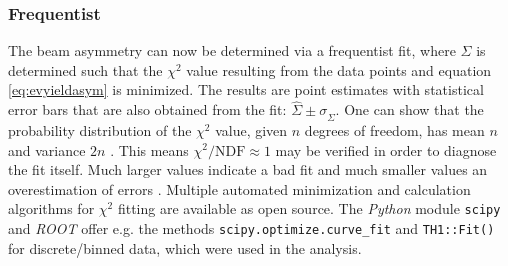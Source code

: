 \subsubsection{Frequentist}
The beam asymmetry can now be determined via a frequentist fit, where $\Sigma$ is determined such that the $\chi^2$ value resulting from the data points and equation \ref{eq:evyieldasym} is minimized. The results are point estimates with statistical error bars that are also obtained from the fit: $\hat{\Sigma}\pm\sigma_{\hat{\Sigma}}$. One can show that the probability distribution of the $\chi^2$ value, given $n$ degrees of freedom, has mean $n$ and variance $2n$ \cite{statistics}. This means $\chi^2/\text{NDF}\approx1$ may be verified in order to diagnose the fit itself. Much larger values indicate a bad fit and much smaller values an overestimation of errors \cite{statistics}. Multiple automated minimization and calculation algorithms for $\chi^2$ fitting are available as open source. The \emph{Python} \cite{python} module \texttt{scipy} \cite{scipy} and \emph{ROOT} \cite{root} offer e.g. the methods \texttt{scipy.optimize.curve\_fit} \cite{pFit} and \texttt{TH1::Fit()} \cite{rFit} for discrete/binned data, which were used in the analysis.

